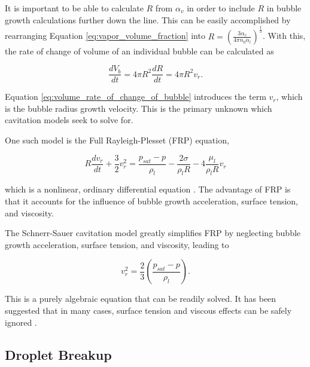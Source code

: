 \documentclass{UCF_ETD}
\begin{document}
It is important to be able to calculate $R$ from $\alpha_{v}$ in order to include $R$ in bubble growth calculations further down the line. This can be easily accomplished by rearranging Equation \ref{eq:vapor_volume_fraction} into $R=\left( \frac{3\alpha_{v}}{4\pi n_{0} \alpha_{l}} \right)^{\frac{1}{3}}$. With this, the rate of change of volume of an individual bubble can be calculated as

\begin{equation}
    \frac{dV_{b}}{dt} = 4\pi R^{2} \frac{dR}{dt} = 4\pi R^{2} v_{r}.
    \label{eq:volume_rate_of_change_of_bubble}
\end{equation}

Equation \ref{eq:volume_rate_of_change_of_bubble} introduces the term $v_{r}$, which is the bubble radius growth velocity. This is the primary unknown which cavitation models seek to solve for.

One such model is the Full Rayleigh-Plesset (FRP) equation,

\begin{equation}
    R\frac{dv_{r}}{dt} + \frac{3}{2} v_{r}^{2} = \frac{p_{sat} - p}{\rho_{l}} - \frac{2\sigma}{\rho_{l}R} - 4\frac{\mu_{l}}{\rho_{l}R}v_{r}
    \label{eq:Rayleigh-Plesset}
\end{equation}

which is a nonlinear, ordinary differential equation \cite{rayleigh1917, plesset1949}. The advantage of FRP is that it accounts for the influence of bubble growth acceleration, surface tension, and viscosity. 

The Schnerr-Sauer cavitation model \cite{schnerr2001physical} greatly simplifies FRP by neglecting bubble growth acceleration, surface tension, and viscosity, leading to 

\begin{equation}
    v_{r}^{2} = \frac{2}{3} \left( \frac{p_{sat} - p}{\rho_{l}} \right).
    \label{eq:schnerr-sauer}
\end{equation}

This is a purely algebraic equation that can be readily solved. It has been suggested that in many cases, surface tension and viscous effects can be safely ignored \cite{CavitationBubbleDynamics}. 

\subsection{Droplet Breakup}
\end{document}
